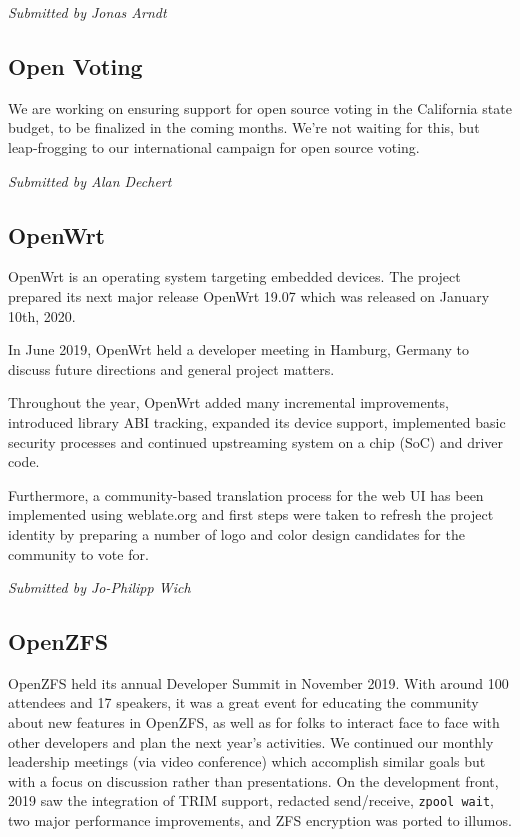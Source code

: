 \documentclass[a4paper]{report}
\begin{document}
{\em Submitted by Jonas Arndt}

\subsection{Open Voting}

We are working on ensuring support for open source voting in the
California state budget, to be finalized in the coming months.  We're
not waiting for this, but leap-frogging to our international campaign
for open source voting.

{\em Submitted by Alan Dechert}

\subsection{OpenWrt}

OpenWrt is an operating system targeting embedded devices.  The project
prepared its next major release OpenWrt 19.07 which was released on
January 10th, 2020.

In June 2019, OpenWrt held a developer meeting in Hamburg, Germany to
discuss future directions and general project matters.

Throughout the year, OpenWrt added many incremental improvements,
introduced library ABI tracking, expanded its device support,
implemented basic security processes and continued upstreaming system on
a chip (SoC) and driver code.

Furthermore, a community-based translation process for the web UI has
been implemented using weblate.org and first steps were taken to refresh
the project identity by preparing a number of logo and color design
candidates for the community to vote for.

{\em Submitted by Jo-Philipp Wich}

\subsection{OpenZFS}

OpenZFS held its annual Developer Summit in November 2019. With around
100 attendees and 17 speakers, it was a great event for educating the
community about new features in OpenZFS, as well as for folks to
interact face to face with other developers and plan the next year's
activities. We continued our monthly leadership meetings (via video
conference) which accomplish similar goals but with a focus on
discussion rather than presentations. On the development front, 2019 saw
the integration of TRIM support, redacted send/receive, \texttt{zpool
wait}, two major performance improvements, and ZFS encryption was ported
to illumos.
\end{document}
